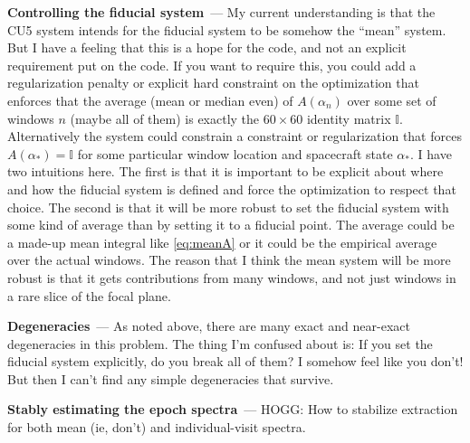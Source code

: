 \documentclass[11pt]{article}
\renewcommand{\paragraph}[1]{\medskip\par\noindent\textbf{#1}~---}
\begin{document}
\paragraph{Controlling the fiducial system}
My current understanding is that the CU5 system intends for the fiducial system to be somehow the ``mean'' system.
But I have a feeling that this is a hope for the code, and not an explicit requirement put on the code.
If you want to require this, you could add a regularization penalty or explicit hard constraint on the optimization that enforces that the average (mean or median even) of $A(\alpha_n)$ over some set of windows $n$ (maybe all of them) is exactly the $60\times 60$ identity matrix $\mathbb{I}$.
Alternatively the system could constrain a constraint or regularization that forces $A(\alpha_\ast)=\mathbb{I}$ for some particular window location and spacecraft state $\alpha_\ast$.
I have two intuitions here.
The first is that it is important to be explicit about where and how the fiducial system is defined and force the optimization to respect that choice.
The second is that it will be more robust to set the fiducial system with some kind of average than by setting it to a fiducial point.
The average could be a made-up mean integral like \eqref{eq:meanA} or it could be the empirical average over the actual windows.
The reason that I think the mean system will be more robust is that it gets contributions from many windows, and not just windows in a rare slice of the focal plane.

\paragraph{Degeneracies}
As noted above, there are many exact and near-exact degeneracies in this problem.
The thing I'm confused about is: If you set the fiducial system explicitly, do you break all of them?
I somehow feel like you don't!
But then I can't find any simple degeneracies that survive.

\paragraph{Stably estimating the epoch spectra}
HOGG: How to stabilize extraction for both mean (ie, don't) and individual-visit spectra.
\end{document}
